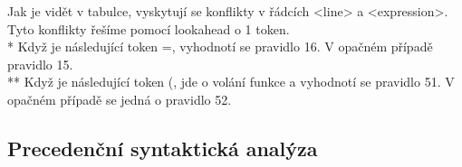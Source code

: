 \documentclass[11pt,a4paper]{article}
\begin{document}
Jak je vidět v tabulce, vyskytují se konflikty v řádcích <line> a <expression>. Tyto konflikty řešíme pomocí lookahead o 1 token. \\
* Když je následující token =, vyhodnotí se pravidlo 16. V opačném případě pravidlo 15. \\
** Když je následující token (, jde o volání funkce a vyhodnotí se pravidlo 51. V opačném případě se jedná o pravidlo 52.\\



\newpage
\subsection{Precedenční syntaktická analýza}
\begin{table}[htbp]
    \centering
    \scriptsize
    \setlength{\tabcolsep}{3.5pt}
    \renewcommand{\arraystretch}{1.25}

    \newcommand{\kRed}{$<$}%
    \newcommand{\vRed}{$>$}%
    \newcommand{\kOra}{$<$}%
    \newcommand{\vOra}{$>$}%
    \newcommand{\kGrn}{$<$}%
    \newcommand{\vGrn}{$>$}%
    \newcommand{\eGrn}{$=$}%
    \newcommand{\kBlk}{$<$}%
    \newcommand{\vBlk}{$>$}%


\end{table}
\end{document}
